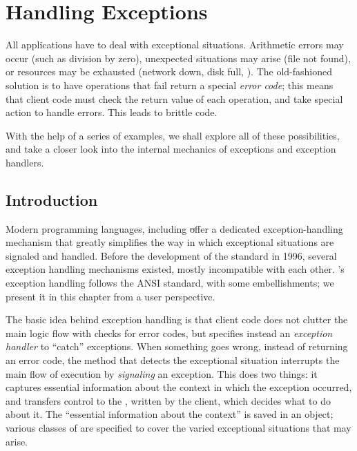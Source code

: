 
\chapter{Handling Exceptions}
\chapterauthor{\authorclement}

All applications have to deal with exceptional situations.
Arithmetic errors may occur (such as division by zero), unexpected situations may arise (file not found), or resources may be exhausted (network down, disk full, \etc).
The old-fashioned solution is to have operations that fail return a special \emph{error code}; this means that client code must check the return value of each operation, and take special action to handle errors. This leads to brittle code. 

With the help of a series of examples, we shall explore all of these possibilities, and take a closer look into the internal mechanics of exceptions and exception handlers.

\section{Introduction}

Modern programming languages, including \st offer a dedicated exception-handling mechanism that greatly simplifies the way in which exceptional situations are signaled and handled.
Before the development of the  standard in 1996, several  exception handling mechanisms existed, mostly incompatible with each other. \pharo's exception handling follows the ANSI standard, with some embellishments; we present it in this chapter from a user perspective.

The basic idea behind exception handling is that 
client code does not clutter the main logic flow with checks for error codes, but specifies instead an \emph{exception handler} to ``catch'' exceptions.
When something goes wrong, instead of returning an error code, the method that detects the exceptional situation interrupts the main flow of execution by  \emph{signaling} an exception.
This does two things: it captures essential information about the context in which the exception occurred, and transfers control to the , written by the client, which decides what to do about it.
The ``essential information about the context'' is saved in an  object; 
various classes of  are specified to cover the varied exceptional situations that may arise.

